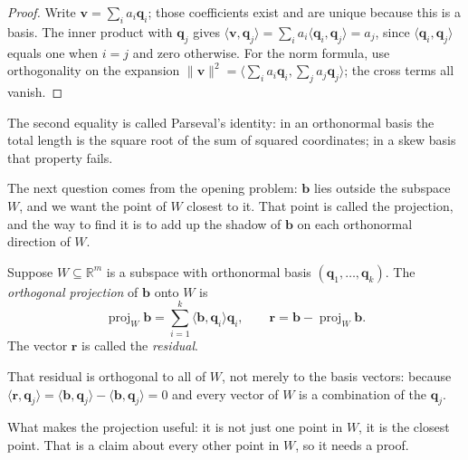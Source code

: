 \begin{proof}
Write $\mathbf{v}=\sum_{i}a_{i}\mathbf{q}_{i}$; those coefficients exist and are unique because
this is a basis. The inner product with $\mathbf{q}_{j}$ gives
$\langle\mathbf{v},\mathbf{q}_{j}\rangle=\sum_{i}a_{i}\langle\mathbf{q}_{i},\mathbf{q}_{j}\rangle
=a_{j}$, since $\langle\mathbf{q}_{i},\mathbf{q}_{j}\rangle$ equals one when $i=j$
and zero otherwise. For the norm formula, use orthogonality on the expansion
$\|\mathbf{v}\|^{2}=\langle\sum_{i}a_{i}\mathbf{q}_{i},\sum_{j}a_{j}\mathbf{q}_{j}\rangle$;
the cross terms all vanish.
\end{proof}

The second equality is called Parseval's identity: in an orthonormal basis the total length is
the square root of the sum of squared coordinates; in a skew basis that property fails.

The next question comes from the opening problem: $\mathbf{b}$ lies outside the subspace
$W$, and we want the point of $W$ closest to it. That point is called the projection,
and the way to find it is to add up the shadow of $\mathbf{b}$ on each orthonormal direction of $W$.


\begin{definisi}
Suppose $W\subseteq\mathbb{R}^{m}$ is a subspace with orthonormal basis
$(\mathbf{q}_{1},\dots,\mathbf{q}_{k})$. The \emph{orthogonal projection} of $\mathbf{b}$ onto $W$
is
\[
  \operatorname{proj}_{W}\mathbf{b}=\sum_{i=1}^{k}\langle\mathbf{b},\mathbf{q}_{i}\rangle\mathbf{q}_{i},
  \qquad
  \mathbf{r}=\mathbf{b}-\operatorname{proj}_{W}\mathbf{b}.
\]
The vector $\mathbf{r}$ is called the \emph{residual}.
\end{definisi}

That residual is orthogonal to all of $W$, not merely to the basis vectors: because
$\langle\mathbf{r},\mathbf{q}_{j}\rangle=\langle\mathbf{b},\mathbf{q}_{j}\rangle
-\langle\mathbf{b},\mathbf{q}_{j}\rangle=0$ and every vector of $W$ is a combination of
the $\mathbf{q}_{j}$.

What makes the projection useful: it is not just one point in $W$, it is the closest
point. That is a claim about every other point in $W$, so it needs a proof.


